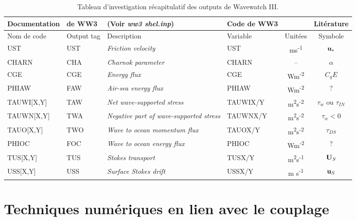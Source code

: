 \documentclass[10pt]{report}
\numberwithin{equation}{section}
\newcommand{\uu}{\vb{u}}
\newcommand{\ust}{\vb{u}_{\ast}}
\begin{document}
\begin{table}[htbp]
\caption{\label{tab:orga46f647}Tableau d'investigation récapitulatif des outputs de Wavewatch III.}
\centering
\begin{tabular}{lll|lc|c}
\hline
\hline
\textbf{Documentation} & \textbf{de WW3} & (Voir \emph{ww3 shel.inp}) & \textbf{Code de WW3} &  & \textbf{Litérature}\\[0pt]
\hline
Nom de code & Output tag & Description & Variable & Unitées & Symbole\\[0pt]
\hline
UST & UST & \emph{Friction velocity} & UST & ms\textsuperscript{-1} & \(\ust\)\\[0pt]
CHARN & CHA & \emph{Charnok parameter} & CHARN & -- & \(\alpha\)\\[0pt]
CGE & CGE & \emph{Energy flux} & CGE & Wm\textsuperscript{-2} & \(C_gE\)\\[0pt]
PHIAW & FAW & \emph{Air-sea energy flux} & PHIAW & Wm\textsuperscript{-2} & ?\\[0pt]
TAUWI[X,Y] & TAW & \emph{Net wave-supported stress} & TAUWIX/Y & m\textsuperscript{2}s\textsuperscript{-2} & \(\tau_w\)  ou \(\tau_{IN}\)\\[0pt]
TAUWN[X,Y] & TWA & \emph{Negative part of wave-supported stress} & TAUWNX/Y & m\textsuperscript{2}s\textsuperscript{-2} & \(\tau_w<0\)\\[0pt]
\hline
TAUO[X,Y] & TWO & \emph{Wave to ocean momentum flux} & TAUOX/Y & m\textsuperscript{2}s\textsuperscript{-2} & \(\tau_{DS}\)\\[0pt]
PHIOC & FOC & \emph{Wave to ocean energy flux} & PHIOC & Wm\textsuperscript{-2} & ?\\[0pt]
TUS[X,Y] & TUS & \emph{Stokes transport} & TUSX/Y & m\textsuperscript{2}s\textsuperscript{-1} & \(\vb{U}_S\)\\[0pt]
USS[X,Y] & USS & \emph{Surface Stokes drift} & USSX/Y & m s\textsuperscript{-1} & \(\uu_S\)\\[0pt]
\hline
\hline
\end{tabular}
\end{table}



\chapter{Techniques numériques en lien avec le couplage}
\label{sec:orga3edb46}
\end{document}
